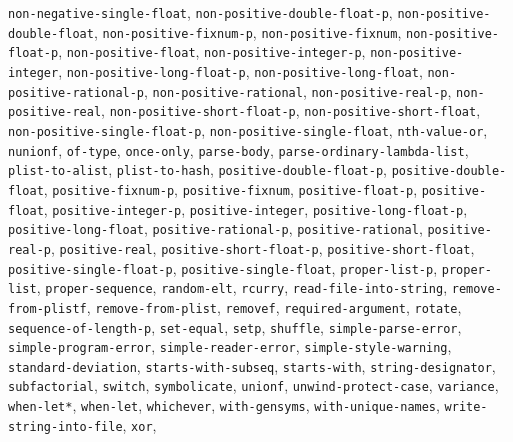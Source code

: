 \texttt{non-negative-single-float}, 
\texttt{non-positive-double-float-p}, 
\texttt{non-positive-double-float}, 
\texttt{non-positive-fixnum-p}, 
\texttt{non-positive-fixnum}, 
\texttt{non-positive-float-p}, 
\texttt{non-positive-float}, 
\texttt{non-positive-integer-p}, 
\texttt{non-positive-integer}, 
\texttt{non-positive-long-float-p}, 
\texttt{non-positive-long-float}, 
\texttt{non-positive-rational-p}, 
\texttt{non-positive-rational}, 
\texttt{non-positive-real-p}, 
\texttt{non-positive-real}, 
\texttt{non-positive-short-float-p}, 
\texttt{non-positive-short-float}, 
\texttt{non-positive-single-float-p}, 
\texttt{non-positive-single-float}, 
\texttt{nth-value-or}, 
\texttt{nunionf}, 
\texttt{of-type}, 
\texttt{once-only}, 
\texttt{parse-body}, 
\texttt{parse-ordinary-lambda-list}, 
\texttt{plist-to-alist}, 
\texttt{plist-to-hash}, 
\texttt{positive-double-float-p}, 
\texttt{positive-double-float}, 
\texttt{positive-fixnum-p}, 
\texttt{positive-fixnum}, 
\texttt{positive-float-p}, 
\texttt{positive-float}, 
\texttt{positive-integer-p}, 
\texttt{positive-integer}, 
\texttt{positive-long-float-p}, 
\texttt{positive-long-float}, 
\texttt{positive-rational-p}, 
\texttt{positive-rational}, 
\texttt{positive-real-p}, 
\texttt{positive-real}, 
\texttt{positive-short-float-p}, 
\texttt{positive-short-float}, 
\texttt{positive-single-float-p}, 
\texttt{positive-single-float}, 
\texttt{proper-list-p}, 
\texttt{proper-list}, 
\texttt{proper-sequence}, 
\texttt{random-elt}, 
\texttt{rcurry}, 
\texttt{read-file-into-string}, 
\texttt{remove-from-plistf}, 
\texttt{remove-from-plist}, 
\texttt{removef}, 
\texttt{required-argument}, 
\texttt{rotate}, 
\texttt{sequence-of-length-p}, 
\texttt{set-equal}, 
\texttt{setp}, 
\texttt{shuffle}, 
\texttt{simple-parse-error}, 
\texttt{simple-program-error}, 
\texttt{simple-reader-error}, 
\texttt{simple-style-warning}, 
\texttt{standard-deviation}, 
\texttt{starts-with-subseq}, 
\texttt{starts-with}, 
\texttt{string-designator}, 
\texttt{subfactorial}, 
\texttt{switch}, 
\texttt{symbolicate}, 
\texttt{unionf}, 
\texttt{unwind-protect-case}, 
\texttt{variance}, 
\texttt{when-let*}, 
\texttt{when-let}, 
\texttt{whichever}, 
\texttt{with-gensyms}, 
\texttt{with-unique-names}, 
\texttt{write-string-into-file}, 
\texttt{xor}, 

